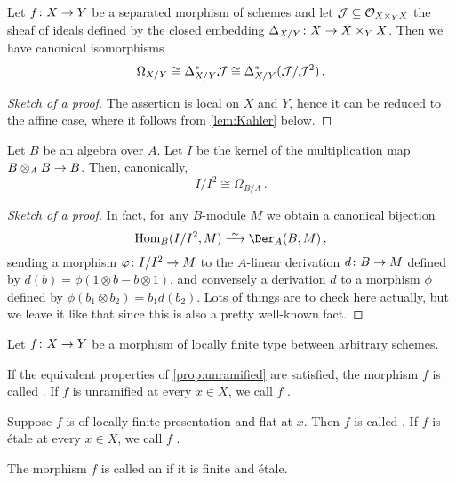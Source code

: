 \begin{prop}\label{prop:Kahler}
	Let $f\colon X\morphism Y$ be a separated morphism of schemes and let $\mathcal{J}\subseteq \mathcal{O}_{X\times_YX}$ the sheaf of ideals defined by the closed embedding $\Delta_{X/Y}\colon X\morphism X\times_YX$. Then we have canonical isomorphisms
	\begin{equation*}
		\Omega_{X/Y}\cong \Delta_{X/Y}^*\mathcal{J}\cong \Delta_{X/Y}^*(\mathcal{J}/\mathcal{J}^2)\,.
	\end{equation*}
\end{prop}
\begin{proof}[Sketch of a proof]
	The assertion is local on $X$ and $Y$, hence it can be reduced to the affine case, where it follows from \cref{lem:Kahler} below.
\end{proof}
\begin{lem}\label{lem:Kahler}
	Let $B$ be an algebra over $A$. Let $I$ be the kernel of the multiplication map $B\otimes_AB\morphism B$. Then, canonically, 
	\begin{equation*}
		I/I^2\cong \Omega_{B/A}\,.
	\end{equation*}
\end{lem}
\begin{proof}[Sketch of a proof]
In fact, for any $B$-module $M$ we obtain a canonical bijection
\begin{equation*}
\Hom_B(I/I^2,M)\isomorphism \Der_A(B,M)\,,
\end{equation*}
sending a morphism $\phi\colon I/I^2\morphism M$ to the $A$-linear derivation $d\colon B\morphism M$ defined by $d(b)=\phi(1\otimes b - b\otimes 1)$, and conversely a derivation $d$ to a morphism $\phi$ defined by $\phi(b_1\otimes b_2)=b_1d(b_2)$. Lots of things are to check here actually, but we leave it like that since this is also a pretty well-known fact.
\end{proof}
\begin{defi}\label{def:etale}
	Let $f\colon X\morphism Y$ be a morphism of locally finite type between arbitrary schemes.
	\begin{alphanumerate}
		\item If the equivalent properties of \cref{prop:unramified} are satisfied, the morphism $f$ is called . If $f$ is unramified at every $x\in X$, we call $f$ .
		\item Suppose $f$ is of locally finite presentation and flat at $x$. Then $f$ is called . If $f$ is étale at every $x\in X$, we call $f$ .
		\item The morphism $f$ is called an  if it is finite and étale.
	\end{alphanumerate}
\end{defi}
